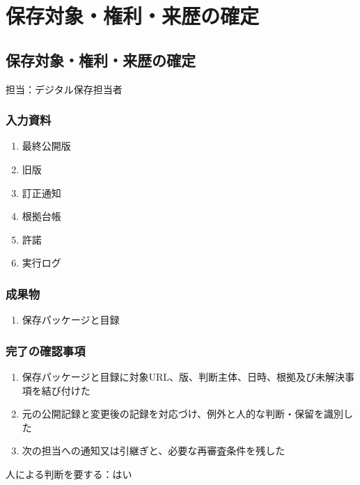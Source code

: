 \documentclass[a4paper,11pt]{article}
\begin{document}
\section{保存対象・権利・来歴の確定}
\subsection{保存対象・権利・来歴の確定}
\par 担当：デジタル保存担当者\par\medskip
\subsubsection*{入力資料}
\begin{enumerate}[leftmargin=2em,itemsep=0.35em]
\item 最終公開版
\item 旧版
\item 訂正通知
\item 根拠台帳
\item 許諾
\item 実行ログ
\end{enumerate}
\subsubsection*{成果物}
\begin{enumerate}[leftmargin=2em,itemsep=0.35em]
\item 保存パッケージと目録
\end{enumerate}
\subsubsection*{完了の確認事項}
\begin{enumerate}[leftmargin=2em,itemsep=0.35em]
\item 保存パッケージと目録に対象URL、版、判断主体、日時、根拠及び未解決事項を結び付けた
\item 元の公開記録と変更後の記録を対応づけ、例外と人的な判断・保留を識別した
\item 次の担当への通知又は引継ぎと、必要な再審査条件を残した
\end{enumerate}
\par 人による判断を要する：はい\par\medskip
\end{document}
